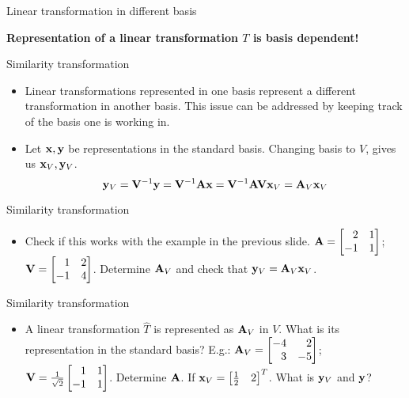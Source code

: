 \documentclass[aspectratio=169]{beamer}
\let\olditem\item
\renewcommand{\item}{\setlength{\itemsep}{\fill}\olditem}
\def\mf{\ensuremath\mathbf}
\def\bmx{\ensuremath\begin{bmatrix*}[r]}
\def\emx{\ensuremath\end{bmatrix*}}
\begin{document}
\begin{frame}[t]{Linear transformation in different basis}
\begin{small}
\textbf{Representation of a linear transformation $T$ is basis dependent! }
\end{small}

\end{frame}


\begin{frame}[t]{Similarity transformation}
\begin{itemize}
    \item Linear transformations represented in one basis represent a different transformation in another basis. This issue can be addressed by keeping track of the basis one is working in.

    \item Let $\mf{x}, \mf{y}$ be representations in the standard basis. Changing basis to $V$, gives us $\mf{x}_V, \mf{y}_V$.
    \[ \mf{y}_V = \mf{V}^{-1}\mf{y} = \mf{V}^{-1}\mf{Ax} = \mf{V}^{-1}\mf{A}\mf{V}\mf{x}_V = \mf{A}_V\mf{x}_V \]
\end{itemize}
\end{frame}


\begin{frame}[t]{Similarity transformation}
\begin{itemize}
    \item Check if this works with the example in the previous slide. $\mf{A} = \begin{bmatrix*}[r]2 & 1\\-1 & 1\end{bmatrix*}$; $\mf{V} = \begin{bmatrix*}[r]1 & 2\\-1 & 4\end{bmatrix*}$. Determine $\mf{A}_V$ and check that $\mf{y}_V = \mf{A}_V\mf{x}_V$.

\end{itemize}
\end{frame}


\begin{frame}[t]{Similarity transformation}
\begin{itemize}
    \item A linear transformation $\hat{T}$ is represented as $\mf{A}_V$ in $V$. What is its representation in the standard basis? E.g.: $\mf{A}_V = \begin{bmatrix*}[r]-4 & 2\\3 & -5\end{bmatrix*}$; $\mf{V} = \frac{1}{\sqrt{2}}\begin{bmatrix*}[r]1 & 1\\-1 & 1\end{bmatrix*}$. Determine $\mf{A}$. If $\mf{x}_V = \bmx \frac{1}{2} & 2\emx^T$. What is $\mf{y}_V$ and $\mf{y}$?
\end{itemize}
\end{frame}
\end{document}
